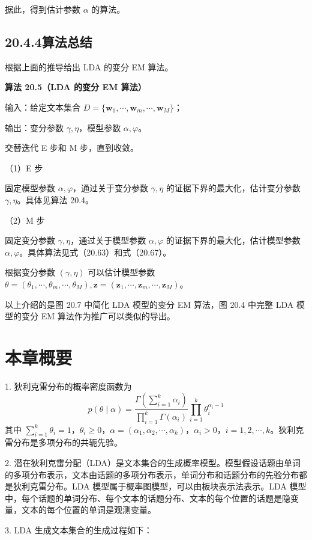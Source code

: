 \documentclass[UTF8, 12pt, fontset=fandol, oneside]{ctexart}
\begin{document}
据此，得到估计参数 $\alpha$ 的算法。

\subsection*{20.4.4\quad 算法总结}

根据上面的推导给出 LDA 的变分 EM 算法。

\noindent\textbf{算法 20.5（LDA 的变分 EM 算法）}

输入：给定文本集合 $D=\{\mathbf{w}_1,\cdots,\mathbf{w}_m,\cdots,\mathbf{w}_M\}$；

输出：变分参数 $\gamma,\eta$，模型参数 $\alpha,\varphi$。

交替迭代 E 步和 M 步，直到收敛。

（1）E 步

固定模型参数 $\alpha,\varphi$，通过关于变分参数 $\gamma,\eta$ 的证据下界的最大化，估计变分参数 $\gamma,\eta$。具体见算法 20.4。

（2）M 步

固定变分参数 $\gamma,\eta$，通过关于模型参数 $\alpha,\varphi$ 的证据下界的最大化，估计模型参数 $\alpha,\varphi$。具体算法见式（20.63）和式（20.67）。

根据变分参数 $(\gamma,\eta)$ 可以估计模型参数 $\theta=(\theta_1,\cdots,\theta_m,\cdots,\theta_M),\mathbf{z}=(\mathbf{z}_1,\cdots,\mathbf{z}_m,\cdots,\mathbf{z}_M)$。

以上介绍的是图 20.7 中简化 LDA 模型的变分 EM 算法，图 20.4 中完整 LDA 模型的变分 EM 算法作为推广可以类似的导出。

\section*{本章概要}

1. 狄利克雷分布的概率密度函数为
\[
p(\theta\mid\alpha)=\frac{\Gamma\left(\sum_{i=1}^k\alpha_i\right)}{\prod_{i=1}^k\Gamma(\alpha_i)}\prod_{i=1}^k\theta_i^{\alpha_i-1}
\]
其中 $\sum_{i=1}^k\theta_i=1$，$\theta_i\geq 0$，$\alpha=(\alpha_1,\alpha_2,\cdots,\alpha_k)$，$\alpha_i>0$，$i=1,2,\cdots,k$。狄利克雷分布是多项分布的共轭先验。

2. 潜在狄利克雷分配（LDA）是文本集合的生成概率模型。模型假设话题由单词的多项分布表示，文本由话题的多项分布表示，单词分布和话题分布的先验分布都是狄利克雷分布。LDA 模型属于概率图模型，可以由板块表示法表示。LDA 模型中，每个话题的单词分布、每个文本的话题分布、文本的每个位置的话题是隐变量，文本的每个位置的单词是观测变量。

3. LDA 生成文本集合的生成过程如下：
\end{document}
